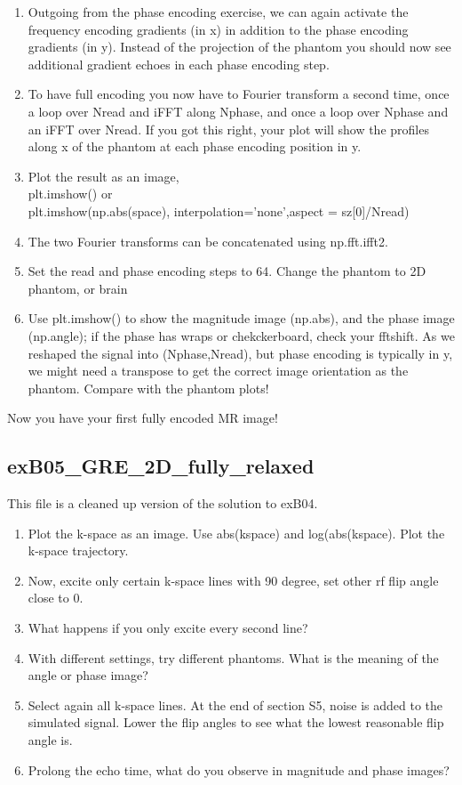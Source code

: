 \documentclass[a4paper,12pt]{extarticle}
\begin{document}
\begin{enumerate}
\item  Outgoing from the phase encoding exercise, we can again activate the frequency encoding gradients (in x) in addition to the phase encoding gradients (in y). Instead of the projection of the phantom you should now see additional gradient echoes in each phase encoding step.
\item To have full encoding you now have to Fourier transform a second time, once a loop over Nread and iFFT along Nphase, and once a loop over Nphase  and an iFFT over Nread. If you got this right, your plot will show the profiles along x of the phantom at each phase encoding position in y.
\item Plot the result as an image, \\plt.imshow()  or \\ plt.imshow(np.abs(space), interpolation='none',aspect = sz[0]/Nread)

\item The two Fourier transforms can be concatenated using np.fft.ifft2. 
\item Set the read and phase encoding steps to 64. Change the phantom to 2D phantom, or brain 
\item Use plt.imshow() to show the magnitude image (np.abs), and the phase image (np.angle); if the phase has wraps or chekckerboard, check your fftshift. As we reshaped the signal into (Nphase,Nread), but phase encoding is typically in y, we might need a transpose to get the correct image orientation as the phantom. Compare with the phantom plots!
\end{enumerate}
Now you have your first fully encoded MR image!


\subsection{exB05\_GRE\_2D\_fully\_relaxed}
This file is a cleaned up version of the solution to exB04.
\begin{enumerate}
\item Plot the k-space as an image. Use abs(kspace) and log(abs(kspace). Plot the k-space trajectory.
\item Now, excite only certain k-space lines with 90 degree, set other rf flip angle close to 0.
\item What happens if you only excite every second line?

\item With different settings, try different phantoms. What is the meaning of the angle or phase image?
\item Select again all k-space lines. At the end of section S5, noise is added to the simulated signal. Lower the flip angles to see what the lowest reasonable flip angle is. 
\item Prolong the echo time, what do you observe in magnitude and phase images?
\end{enumerate}
\end{document}
